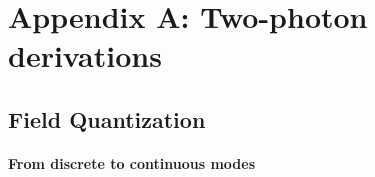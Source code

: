 

\chapter*{Appendix A: Two-photon derivations}
\markboth{}{}
\label{app:App}


\section*{Field Quantization}
\subsubsection*{From discrete to continuous modes}

